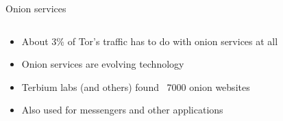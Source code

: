 \documentclass[aspectratio=169,10pt]{beamer}
\begin{document}
  
  \begin{frame}[fragile]{Onion services}
    \begin{columns}
      \begin{column}{0.5\textwidth}
        \begin{itemize}
          \item About 3\% of Tor's traffic has to do with onion services at all
          \item Onion services are evolving technology
          \item Terbium labs (and others) found ~7000 onion websites
          \item Also used for messengers and other applications
        \end{itemize}
      \end{column}
      \begin{column}{0.5\textwidth}
        \begin{center}
          \begin{overlayarea}{\textwidth}{0.5\textheight}

\end{overlayarea}
\end{center}
\end{column}
\end{columns}
\end{frame}
\end{document}
